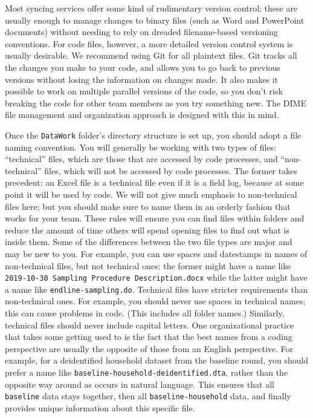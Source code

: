 Most syncing services offer some kind of rudimentary version control;
these are usually enough to manage changes to binary files (such as Word and PowerPoint documents)
without needing to rely on dreaded filename-based versioning conventions.
For code files, however, a more detailed version control system is usually desirable.
We recommend using Git
for all plaintext files.
Git tracks all the changes you make to your code,
and allows you to go back to previous versions without losing the information on changes made.
It also makes it possible to work on multiple parallel versions of the code,
so you don't risk breaking the code for other team members as you try something new.
The DIME file management and organization approach is designed with this in mind.

Once the \texttt{DataWork} folder's directory structure is set up,
you should adopt a file naming convention.
You will generally be working with two types of files:
``technical'' files, which are those that are accessed by code processes,
and ``non-technical'' files, which will not be accessed by code processes.
The former takes precedent: an Excel file is a technical file
even if it is a field log, because at some point it will be used by code.
We will not give much emphasis to non-technical files here;
but you should make sure to name them in an orderly fashion that works for your team.
These rules will ensure you can find files within folders
and reduce the amount of time others will spend opening files
to find out what is inside them.
Some of the differences between the two file types are major and may be new to you. For example,
you can use spaces and datestamps in names of non-technical files, but not technical ones:
the former might have a name like \texttt{2019-10-30 Sampling Procedure Description.docx}
while the latter might have a name like \texttt{endline-sampling.do}.
Technical files have stricter requirements than non-technical ones.
For example, you should never use spaces in technical names;
this can cause problems in code. (This includes all folder names.)
Similarly, technical files should never include capital letters.
One organizational practice that takes some getting used to
is the fact that the best names from a coding perspective
are usually the opposite of those from an English perspective.
For example, for a deidentified household dataset from the baseline round,
you should prefer a name like \texttt{baseline-household-deidentified.dta},
rather than the opposite way around as occurs in natural language.
This ensures that all \texttt{baseline} data stays together,
then all \texttt{baseline-household} data,
and finally provides unique information about this specific file.

